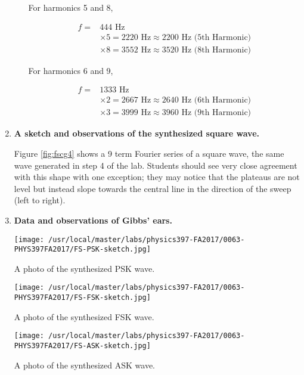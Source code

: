 \begin{enumerate}[resume]
\begin{enumerate}[label=(\Alph*)]
For harmonics 5 and 8,

\begin{align}
f=&444\text{ Hz}\\
&\times5=2220\text{ Hz}\approx 2200\text{ Hz (5th Harmonic)}\\
&\times8=3552\text{ Hz}\approx 3520\text{ Hz (8th Harmonic)}
\label{equ:fscg13}
\end{align}\newline

For harmonics 6 and 9,

\begin{align}
f=&1333\text{ Hz}\\
&\times2=2667\text{ Hz}\approx 2640\text{ Hz (6th Harmonic)}\\
&\times3=3999\text{ Hz}\approx 3960\text{ Hz (9th Harmonic)}
\label{equ:fscg14}
\end{align}

\end{enumerate}



\item {\bf A sketch and observations of the synthesized square wave.}\newline

Figure \ref{fig:fscg4} shows a 9 term Fourier series of a square wave, the same wave generated in step 4 of the lab. Students should see very close agreement with this shape with one exception; they may notice that the plateaus are not level but instead slope towards the central line in the direction of the sweep (left to right).

\pagebreak
\item {\bf Data and observations of Gibbs' ears.}

\begin{marginfigure}
\texttt{[image: /usr/local/master/labs/physics397-FA2017/0063-PHYS397FA2017/FS-PSK-sketch.jpg]}
\caption{A photo of the synthesized PSK wave.}
\label{fig:fscg13}
\end{marginfigure}

\begin{marginfigure}
\texttt{[image: /usr/local/master/labs/physics397-FA2017/0063-PHYS397FA2017/FS-FSK-sketch.jpg]}
\caption{A photo of the synthesized FSK wave.}
\label{fig:fscg14}
\end{marginfigure}



\begin{marginfigure}
\texttt{[image: /usr/local/master/labs/physics397-FA2017/0063-PHYS397FA2017/FS-ASK-sketch.jpg]}
\caption{A photo of the synthesized ASK wave.}
\label{fig:fscg15}
\end{marginfigure}



\end{enumerate}
